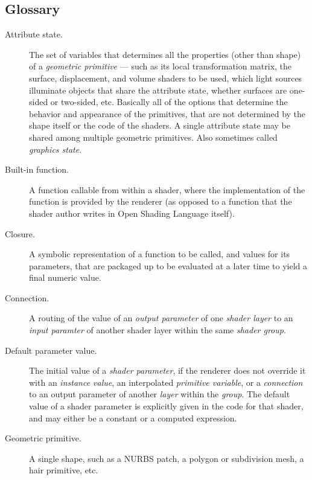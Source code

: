 \documentclass[11pt,letterpaper]{book}
\def\langname{Open Shading Language\xspace}
\begin{document}
\begin{appendix}

\chapter{Glossary}
\label{chap:glossary}

\begin{description}

\item[Attribute state.] The set of variables that determines all the
  properties (other than shape) of a \emph{geometric primitive} --- such
  as its local transformation matrix, the surface, displacement, and
  volume shaders to be used, which light sources illuminate objects that
  share the attribute state, whether surfaces are one-sided or
  two-sided, etc.  Basically all of the options that determine the
  behavior and appearance of the primitives, that are not determined by
  the shape itself or the code of the shaders.  A single attribute state
  may be shared among multiple geometric primitives.  Also sometimes
  called \emph{graphics state}.

\item[Built-in function.] A function callable from within a shader, where
  the implementation of the function is provided by the renderer (as
  opposed to a function that the shader author writes in \langname
  itself).

\item[Closure.] A symbolic representation of a function to be called,
  and values for its parameters, that are packaged up to be evaluated
  at a later time to yield a final numeric value.

\item[Connection.] A routing of the value of an \emph{output parameter}
  of one \emph{shader layer} to an \emph{input paramter} of another
  shader layer within the same \emph{shader group}.

\item[Default parameter value.] The initial value of a \emph{shader
  parameter}, if the renderer does not override it with an
  \emph{instance value}, an interpolated \emph{primitive variable}, or a
  \emph{connection} to an output parameter of another \emph{layer}
  within the \emph{group}.  The default value of a shader parameter
  is explicitly given in the code for that shader, and may either be
  a constant or a computed expression.

\item[Geometric primitive.] A single shape, such as a NURBS patch, a
  polygon or subdivision mesh, a hair primitive, etc.


\end{description}
\end{appendix}
\end{document}
